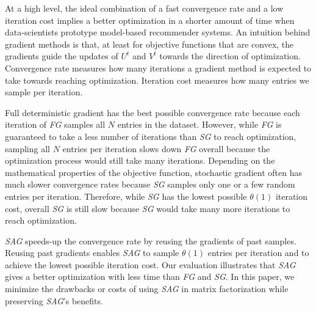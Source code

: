 At a high level, the ideal combination of a fast convergence rate and a low iteration cost implies a better optimization in a shorter amount of time when data-scientists prototype model-based recommender systems.
An intuition behind gradient methods is that, at least for objective functions that are convex, the gradients guide the updates of $U^t$ and $V^t$ towards the direction of optimization.  
Convergence rate measures how many iterations a gradient method is expected to take towards reaching optimization. 
Iteration cost measures how many entries we sample per iteration.

Full deterministic gradient has the best possible convergence rate because each iteration of \emph{FG} samples all $N$ entries in the dataset.
However, while \emph{FG} is guaranteed to take a less number of iterations than \emph{SG} to reach optimization, sampling all $N$ entries per iteration slows down \emph{FG} overall because the optimization process would still take many iterations.
Depending on the mathematical properties of the objective function, stochastic gradient often has much slower convergence rates because \emph{SG} samples only one or a few random entries per iteration.
Therefore, while \emph{SG} has the lowest possible $\theta(1)$ iteration cost, overall \emph{SG} is still slow because \emph{SG} would take many more iterations to reach optimization.

\emph{SAG} speeds-up the convergence rate by reusing the gradients of past samples.  
Reusing past gradients enables \emph{SAG} to sample $\theta(1)$ entries per iteration and to achieve the lowest possible iteration cost.  
Our evaluation illustrates that \emph{SAG} gives a better optimization with less time than \emph{FG} and \emph{SG}.  
In this paper, we minimize the drawbacks or costs of using \emph{SAG} in matrix factorization while preserving \emph{SAG}'s benefits.
